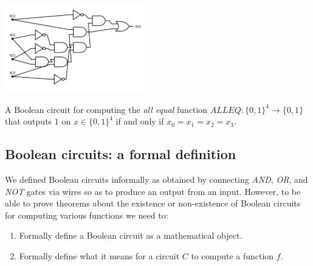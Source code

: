 

\begin{marginfigure}
\centering
\includegraphics[width=\linewidth, height=1.5in, keepaspectratio]{../figure/allequalcirc2.png}
\caption{A Boolean circuit for computing the \emph{all equal} function
\(\ensuremath{\mathit{ALLEQ}}:\{0,1\}^4 \rightarrow \{0,1\}\) that
outputs \(1\) on \(x\in \{0,1\}^4\) if and only if \(x_0=x_1=x_2=x_3\).}
\label{allequalfig}
\end{marginfigure}

\subsection{Boolean circuits: a formal
definition}\label{Boolean-circuits-a-formal}

We defined Boolean circuits informally as obtained by connecting
\emph{AND}, \emph{OR}, and \emph{NOT} gates via wires so as to produce
an output from an input. However, to be able to prove theorems about the
existence or non-existence of Boolean circuits for computing various
functions we need to:

\begin{enumerate}
\def\labelenumi{\arabic{enumi}.}
\item
  Formally define a Boolean circuit as a mathematical object.
\item
  Formally define what it means for a circuit \(C\) to compute a
  function \(f\).
\end{enumerate}

